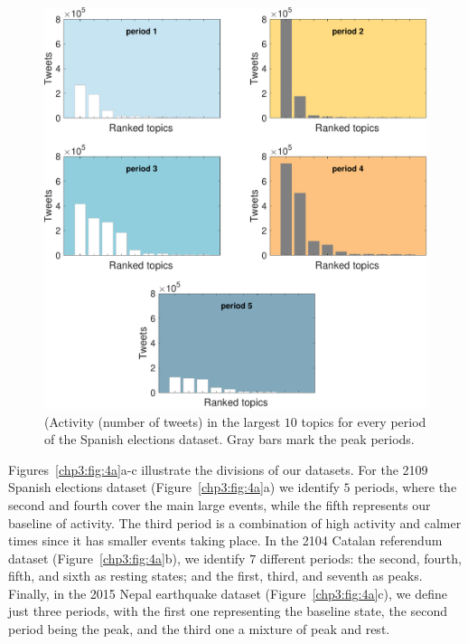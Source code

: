 \begin{figure}
   \includegraphics[width=1\textwidth]{figures/chp3/fig4b.pdf}
   
    \caption[Activity distribution through topics and periods]{(Activity (number of tweets) in the largest $10$ topics for every period of the Spanish elections dataset. Gray bars mark the peak periods.}
   \label{chp3:fig:4b}
\end{figure}
Figures~\ref{chp3:fig:4a}a-c illustrate the divisions of our datasets. For the 2109 Spanish elections dataset (Figure~\ref{chp3:fig:4a}a) we identify $5$ periods, where the second and fourth cover the main large events, while the fifth represents our baseline of activity. The third period is a combination of high activity and calmer times since it has smaller events taking place. In the 2104 Catalan referendum dataset (Figure~\ref{chp3:fig:4a}b), we identify $7$  different periods: the second, fourth, fifth, and sixth as resting states; and the first, third, and seventh as peaks. Finally, in the 2015 Nepal earthquake dataset (Figure~\ref{chp3:fig:4a}c), we define just three periods, with the first one representing the baseline state, the second period being the peak, and the third one a mixture of peak and rest.  \\

